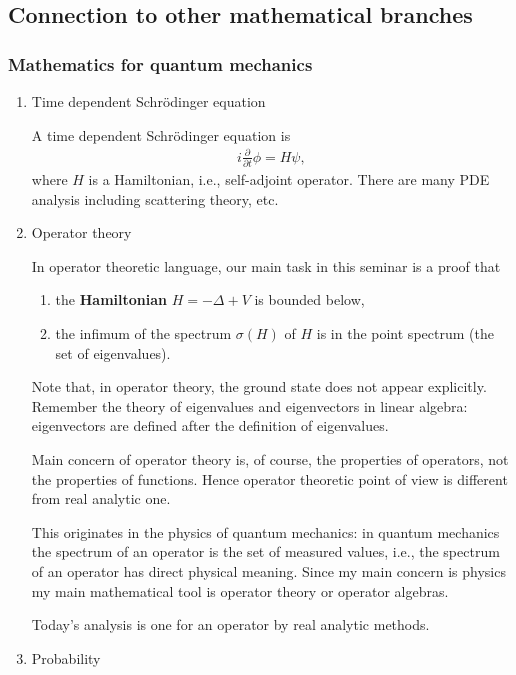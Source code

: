 \documentclass[openany, a4paper, oneside]{jsbook}
\begin{document}
\subsection{Connection to other mathematical branches}

\subsubsection{Mathematics for quantum mechanics}

\begin{enumerate}
\item Time dependent Schr\"odinger equation

A time dependent Schr\"odinger equation is
\begin{align}
 i \frac{\partial}{\partial t} \phi = H \psi,
\end{align}
where $H$ is a Hamiltonian, i.e., self-adjoint operator.
There are many PDE analysis including scattering theory, etc.
\item Operator theory

In operator theoretic language, our main task in this seminar is a proof that
\begin{enumerate}
\item the \textbf{Hamiltonian} $H = - \Delta + V$ is bounded below,
\item the infimum of the spectrum $\sigma (H)$ of $H$ is in the point spectrum (the set of eigenvalues).
\end{enumerate}
Note that, in operator theory, the ground state does not appear explicitly.
Remember the theory of eigenvalues and eigenvectors in linear algebra:
eigenvectors are defined after the definition of eigenvalues.

Main concern of operator theory is, of course, the properties of operators, not the properties of functions.
Hence operator theoretic point of view is different from real analytic one.

This originates in the physics of quantum mechanics:
in quantum mechanics the spectrum of an operator is the set of measured values, i.e.,
the spectrum of an operator has direct physical meaning.
Since my main concern is physics my main mathematical tool is operator theory or operator algebras.

Today's analysis is one for an operator by real analytic methods.
\item Probability


\end{enumerate}
\end{document}
